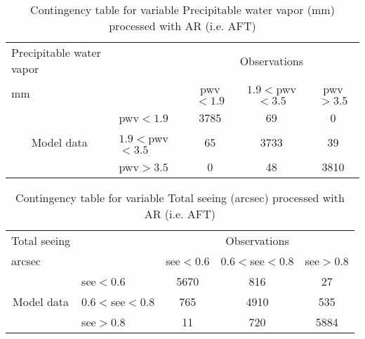 \documentclass[11pt,english]{article}
\begin{document}
\begin{table}[]
\begin{center}
\begin{tabular}{llccc}
\hline
{Precipitable water vapor}                                       &                                                    & \multicolumn{3}{c}{Observations}                 \\
{mm}                                       &                             & pwv$<1.9$   & $1.9<$pwv$<3.5$ & pwv$>3.5$ \\
\hline
\multicolumn{1}{c}{\multirow{3}{*}{Model data}}  & pwv$<1.9$          & 3785                & 69                       & 0              \\
                                                 & $1.9<$pwv$<3.5$ & 65                & 3733                       & 39              \\
                                                 & pwv$>3.5$          & 0                & 48                       & 3810              \\
\hline
\end{tabular}
\end{center}
\caption{Contingency table for variable Precipitable water vapor (mm) processed with AR (i.e. AFT)}
\label{tab:contingency}
\end{table}

\begin{table}[]
\begin{center}
\begin{tabular}{llccc}
\hline
{Total seeing}                                       &                                                    & \multicolumn{3}{c}{Observations}                 \\
{arcsec}                                       &                             & see$<0.6$   & $0.6<$see$<0.8$ & see$>0.8$ \\
\hline
\multicolumn{1}{c}{\multirow{3}{*}{Model data}}  & see$<0.6$          & 5670                & 816                       & 27              \\
                                                 & $0.6<$see$<0.8$ & 765                & 4910                       & 535              \\
                                                 & see$>0.8$          & 11                & 720                       & 5884              \\
\hline
\end{tabular}
\end{center}
\caption{Contingency table for variable Total seeing (arcsec) processed with AR (i.e. AFT)}
\label{tab:contingency}
\end{table}
\end{document}
